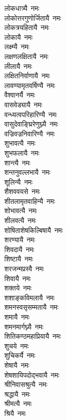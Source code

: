 \begin{multicols}{\maxColumns}
\begin{flushleft}
लोकधात्र्यै~नमः\\
लोकोत्तरगुणोर्जितायै~नमः\\
लोकत्रयहितायै~नमः\\
लोकायै~नमः\\
लक्ष्म्यै~नमः\\
लक्षणलक्षितायै~नमः\\
लीलायै~नमः\\
लक्षितनिर्वाणायै~नमः\\
लावण्यामृतवर्षिण्यै~नमः\hfill{}\\
वैश्वानर्यै~नमः\\
वासवेड्यायै~नमः\\
वन्ध्यत्वपरिहारिण्यै~नमः\\
वासुदेवाङ्घ्रिरेणुघ्न्यै~नमः\\
वज्रिवज्रनिवारिण्यै~नमः\\
शुभावत्यै~नमः\\
शुभफलायै~नमः\\
शान्त्यै~नमः\\
शन्तनुवल्लभायै~नमः\\
शूलिन्यै~नमः\hfill{}\\
शैशववयसे~नमः\\
शीतलामृतवाहिन्यै~नमः\\
शोभावत्यै~नमः\\
शीलवत्यै~नमः\\
शोषिताशेषकिल्बिषायै~नमः\\
शरण्यायै~नमः\\
शिवदायै~नमः\\
शिष्टायै~नमः\\
शरजन्मप्रस्वै~नमः\\
शिवायै~नमः\hfill{}\\
शक्तये~नमः\\
शशाङ्कविमलायै~नमः\\
शमनस्वसृसम्मतायै~नमः\\
शमायै~नमः\\
शमनमार्गघ्न्यै~नमः\\
शितिकण्ठमहाप्रियायै~नमः\\
शुचये~नमः\\
शुचिकर्यै~नमः\\
शेषायै~नमः\\
शेषशायिपदोद्भवायै~नमः\hfill{}\\
श्रीनिवासश्रुत्यै~नमः\\
श्रद्धायै~नमः\\
श्रीमत्यै~नमः\\
श्रियै~नमः\\

\end{flushleft}
\end{multicols}

